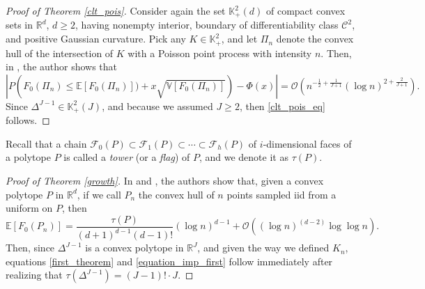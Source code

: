 \documentclass[12pt, reqno]{amsart}
\theoremstyle{definition}
\begin{document}
\begin{proof}[Proof of Theorem \ref{clt_pois}]
    Consider again the set $\mathbb{K}^2_+(d)$ of compact convex sets in $\mathbb{R}^d$, $d \geq 2$, having nonempty interior, boundary of differentiability class $\mathcal{C}^2$, and positive Gaussian curvature. Pick any $K \in \mathbb{K}^2_+$, and let $\Pi_n$ denote the convex hull of the intersection of $K$ with a Poisson point process with intensity $n$. Then, in \cite[Proof of Theorem 2, pages 501--502]{reitzner1}, the author shows that
    $$\left| P\left( F_0(\Pi_n)\leq \mathbb{E}[F_0(\Pi_n)]) + x \sqrt{\mathbb{V}[F_0(\Pi_n)]}\right) - \Phi(x)\right| = \mathcal{O}\left( n^{-\frac{1}{2}+\frac{1}{J+1}}\left(\log n\right)^{2+\frac{2}{J+1}} \right).$$
    Since $\Delta^{J-1}\in\mathbb{K}^2_+(J)$, and because we assumed $J\geq 2$, then \eqref{clt_pois_eq} follows.
\end{proof}
\fi


Recall that a chain $\mathcal{F}_0(P)\subset \mathcal{F}_1(P) \subset \cdots \subset \mathcal{F}_{h}(P)$ of $i$-dimensional faces of a polytope $P$ is called a \textit{tower} (or a \textit{flag}) of $P$, and we denote it as $\tau(P)$.

\begin{proof}[Proof of Theorem \ref{growth}]
 In \cite[Theorem 6]{reitzner} and \cite[Theorem 5]{barany2}, the authors show that, given a convex polytope $P$ in $\mathbb{R}^d$, if we call $P_n$ the convex hull of $n$ points sampled iid from a uniform on $P$, then 
$$\mathbb{E} \left[F_0(P_n)\right] = \frac{\tau(P)}{(d+1)^{d-1}  (d-1)!}  (\log n)^{d-1} + \mathcal{O} \left( (\log n)^{(d-2)} \log\log n \right).$$
Then, since $\Delta^{J-1}$ is a convex polytope in $\mathbb{R}^J$, and given the way we defined $K_n$, equations \eqref{first_theorem} and \eqref{equation_imp_first} follow immediately after realizing that $\tau(\Delta^{J-1})=(J-1)! \cdot J$.
\end{proof}
\end{document}
